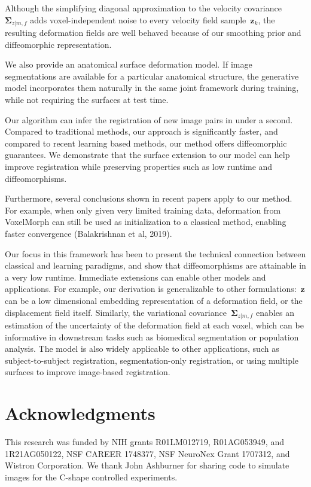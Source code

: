 \documentclass{article}
\newcommand{\bSigma}{\boldsymbol{\Sigma}}
\newcommand{\bz}{\boldsymbol{z}}
\newcommand{\moving}{m}
\newcommand{\fixed}{f}
\begin{document}
Although the simplifying diagonal approximation to the velocity covariance~$\bSigma_{z |\moving, \fixed}$ adds voxel-independent noise to every velocity field sample~$\bz_k$, the resulting deformation fields are well behaved because of our smoothing prior and diffeomorphic representation.

We also provide an anatomical surface deformation model. If image segmentations are available for a particular anatomical structure, the generative model incorporates them naturally in the same joint framework during training, while not requiring the surfaces at test time. 



Our algorithm can infer the registration of new image pairs in under a second. Compared to traditional methods, our approach is significantly faster, and compared to recent learning based methods, our method offers diffeomorphic guarantees. We demonstrate that the surface extension to our model can help improve registration while preserving properties such as low runtime and diffeomorphisms. 


{\color{blue} Furthermore, several conclusions shown in recent papers apply to our method. For example, when only given very limited training data, deformation from VoxelMorph can still be used as initialization to a classical method, enabling faster convergence (Balakrishnan et al, 2019).}

Our focus in this framework has been to present the technical connection between classical and learning paradigms, and show that diffeomorphisms are attainable in a very low runtime. Immediate extensions can enable other models and applications. For example, our derivation is generalizable to other formulations:~$\bz$ can be a low dimensional embedding representation of a deformation field, or the displacement field itself. Similarly, the variational covariance~$\bSigma_{z|\moving,\fixed}$ enables an estimation of the uncertainty of the deformation field at each voxel, which can be informative in downstream tasks such as biomedical segmentation or population analysis. The model is also widely applicable to other applications, such as subject-to-subject registration, segmentation-only registration, or using multiple surfaces to improve image-based registration. 


\vspace{-0.15cm}
\section{Acknowledgments}
\vspace{-0.1cm}
This research was funded by NIH grants R01LM012719, R01AG053949, and 1R21AG050122, NSF CAREER 1748377, NSF NeuroNex Grant 1707312, and Wistron Corporation. {\color{blue} We thank John Ashburner for sharing code to simulate images for the C-shape controlled experiments.} 
\end{document}
